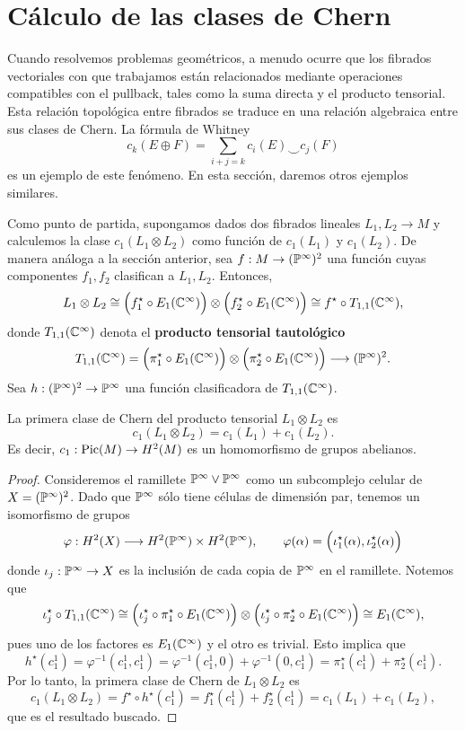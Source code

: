 \section{Cálculo de las clases de Chern}

Cuando resolvemos problemas geométricos, a menudo ocurre que los fibrados vectoriales con que trabajamos están relacionados mediante operaciones compatibles con el pullback, tales como la suma directa y el producto tensorial. Esta relación topológica entre fibrados se traduce en una relación algebraica entre sus clases de Chern. La fórmula de Whitney
$$c_k(E \oplus F) = \sum_{i+j=k} c_i(E) \smile c_j(F)$$
es un ejemplo de este fenómeno. En esta sección, daremos otros ejemplos similares.

Como punto de partida, supongamos dados dos fibrados lineales $L_1, L_2 \to M$ y calculemos la clase $c_1(L_1 \otimes L_2)$ como función de $c_1(L_1)$ y $c_1(L_2)$. De manera análoga a la sección anterior, sea $f : M \to (\P^\infty)^2$ una función cuyas componentes $f_1, f_2$ clasifican a $L_1, L_2$. Entonces,
$$
L_1 \otimes L_2
    \cong \Big( f_1^\star \circ E_1(\C^\infty) \Big) \otimes \Big( f_2^\star \circ E_1(\C^\infty) \Big)
    \cong f^\star \circ T_{1,1}(\C^\infty),
$$
donde $T_{1,1}(\C^\infty)$ denota el \textbf{producto tensorial tautológico}
$$
T_{1,1}(\C^\infty)
    = \Big( \pi_1^\star \circ E_1(\C^\infty) \Big) \otimes \Big( \pi_2^\star \circ E_1(\C^\infty) \Big)
    \longrightarrow (\P^\infty)^2.
$$
Sea $h : (\P^\infty)^2 \to \P^\infty$ una función clasificadora de $T_{1,1}(\C^\infty)$.

\begin{proposition}
La primera clase de Chern del producto tensorial $L_1 \otimes L_2$ es
$$c_1(L_1 \otimes L_2) = c_1(L_1) + c_1(L_2).$$
Es decir, $c_1 : \Pic(M) \to H^2(M)$ es un homomorfismo de grupos abelianos.
\end{proposition}

\begin{proof}
Consideremos el ramillete $\P^\infty \vee \P^\infty$ como un subcomplejo celular de $X = (\P^\infty)^2$. Dado que $\P^\infty$ sólo tiene células de dimensión par, tenemos un isomorfismo de grupos
$$
\varphi : H^2(X) \longrightarrow H^2(\P^\infty) \times H^2(\P^\infty), \qquad
\varphi(\alpha) = \Big( \iota_1^\star(\alpha), \iota_2^\star(\alpha) \Big)
$$
donde $\iota_j : \P^\infty \to X$ es la inclusión de cada copia de $\P^\infty$ en el ramillete. Notemos que
$$
\iota_j^\star \circ T_{1,1}(\C^\infty)
    \cong \Big( \iota_j^\star \circ \pi_1^\star \circ E_1(\C^\infty) \Big) \otimes
            \Big( \iota_j^\star \circ \pi_2^\star \circ E_1(\C^\infty) \Big)
    \cong E_1(\C^\infty),
$$
pues uno de los factores es $E_1(\C^\infty)$ y el otro es trivial. Esto implica que
$$
h^\star(c_1^1)
    = \varphi^{-1}(c_1^1, c_1^1)
    = \varphi^{-1}(c_1^1, 0) + \varphi^{-1}(0, c_1^1)
    = \pi_1^\star(c_1^1) + \pi_2^\star(c_1^1).
$$
Por lo tanto, la primera clase de Chern de $L_1 \otimes L_2$ es
$$c_1(L_1 \otimes L_2)
    = f^\star \circ h^\star(c_1^1)
    = f_1^\star(c_1^1) + f_2^\star(c_1^1)
    = c_1(L_1) + c_1(L_2),
$$
que es el resultado buscado.
\end{proof}

